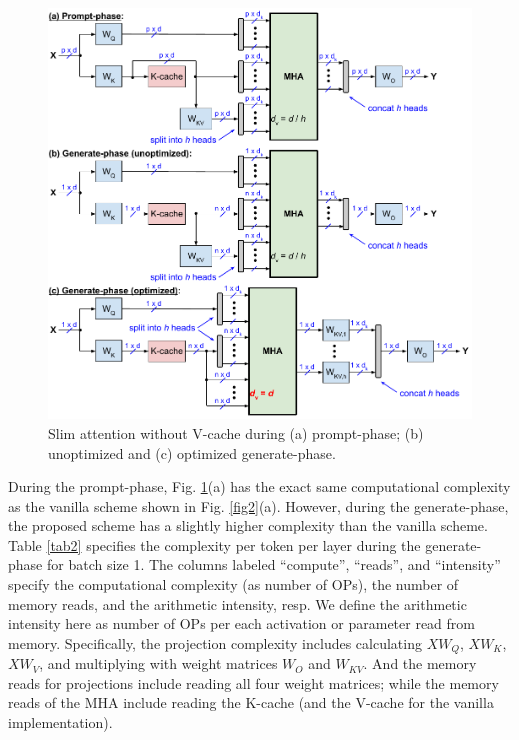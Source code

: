 \documentclass{article}
\begin{document}
\begin{figure}[h!] \centering
  \includegraphics[scale=0.88]{../doc/fig/slimAttn_fig3.pdf}
  \caption{Slim attention without V-cache during (a) prompt-phase; (b) unoptimized and (c) optimized generate-phase.}
\label{fig3} \end{figure}

During the prompt-phase, Fig. \ref{fig3}(a) has the exact same computational complexity as the vanilla scheme shown in Fig. \ref{fig2}(a). However, during the generate-phase, the proposed scheme has a slightly higher complexity than the vanilla scheme. Table \ref{tab2} specifies the complexity per token per layer during the generate-phase for batch size 1. The columns labeled ``compute'', ``reads'', and ``intensity'' specify the computational complexity (as number of OPs), the number of memory reads, and the arithmetic intensity, resp. We define the arithmetic intensity here as number of OPs per each activation or parameter read from memory. Specifically, the projection complexity includes calculating $X W_Q$, $X W_K$, $X W_V$, and multiplying with weight matrices $W_O$ and $W_{KV}$. And the memory reads for projections include reading all four weight matrices; while the memory reads of the MHA include reading the K-cache (and the V-cache for the vanilla implementation).
\end{document}
